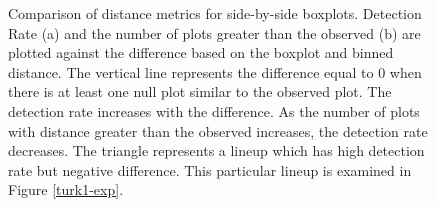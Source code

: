\documentclass[12]{article}
\begin{document}
\begin{figure}[hbtp]
\centering
{}
	\vspace{-.1in}
\caption[Optional caption for list of figures]{Comparison of distance metrics for side-by-side boxplots. Detection Rate (a) and the number of plots greater than the observed (b) are plotted against the difference based on the boxplot and binned distance. The vertical line represents the difference equal to 0 when there is at least one null plot similar to the observed plot. The detection rate increases with the difference. As the number of plots with distance greater than the observed increases, the detection rate decreases.  The triangle represents a lineup which has high detection rate but negative difference. This particular lineup is examined in Figure \ref{turk1-exp}. }
\label{turk1comp}
\end{figure}

\end{document}
